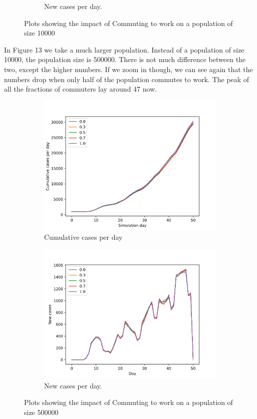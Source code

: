 \documentclass[runningheads]{llncs}
\begin{document}
\begin{figure}[h!]
\begin{subfigure}[b]{0.7\linewidth}
		\caption{New cases per day.} 
	\end{subfigure}
	\caption{Plots showing the impact of Commuting to work on a population of size 10000}
	\label{VaccinePlot}
\end{figure}

In Figure 13 we take a much larger population. Instead of a population of size 10000, the population size is 500000. There is not much difference between the two, except the higher numbers. If we zoom in though, we can see again that the numbers drop when only half of the population commutes to work. The peak of all the fractions of commuters lay around 47 now. 


\begin{figure}[h!]
	\centering
	\begin{subfigure}[b]{0.7\linewidth}
		\includegraphics[width=\textwidth]{population500000_Cumulative.png}
		\caption{Cumulative cases per day} 
	\end{subfigure}
	\begin{subfigure}[b]{0.7\linewidth}
		\includegraphics[width=\textwidth]{population500000_cases_per_day.png}
		\caption{New cases per day.} 
	\end{subfigure}
	\caption{Plots showing the impact of Commuting to work on a population of size 500000}
	\label{VaccinePlot}
\end{figure}
\end{document}
